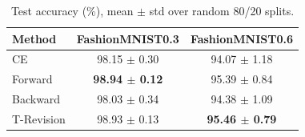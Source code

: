 \begin{table}[t]
\caption{Test accuracy (\%), mean $\pm$ std over random 80/20 splits.}
\label{tab:accuracy}
\begin{center}
\begin{tabular}{lcc}
\toprule
\textbf{Method} & \textbf{FashionMNIST0.3} & \textbf{FashionMNIST0.6} \\
\midrule
CE & 98.15 $\pm$ 0.30 & 94.07 $\pm$ 1.18 \\
Forward & \textbf{98.94 $\pm$ 0.12} & 95.39 $\pm$ 0.84 \\
Backward & 98.03 $\pm$ 0.34 & 94.38 $\pm$ 1.09 \\
T-Revision & 98.93 $\pm$ 0.13 & \textbf{95.46 $\pm$ 0.79} \\
\bottomrule
\end{tabular}
\end{center}
\end{table}
